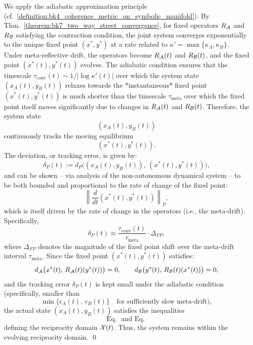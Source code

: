 \begin{demonstratio}
\label{demonstratio:bk7_meta_drift_reflective_tracking}
We apply the adiabatic approximation principle (cf.~\ref{definition:bk4_coherence_metric_on_symbolic_manifold}). By Thm.~\ref{theorem:bk7_two_way_street_convergence}, for fixed operators \(R_{\mathcal{A}}\) and \(R_{\mathcal{B}}\) satisfying the contraction condition, the joint system converges exponentially to the unique fixed point \((x^*, y^*)\) at a rate related to \(\kappa' = \max\{\kappa_A, \kappa_B\}\). Under meta-reflective drift, the operators become \(R_{\mathcal{A}}(t)\) and \(R_{\mathcal{B}}(t)\), and the fixed point \((x^*(t), y^*(t))\) evolves.
The adiabatic condition ensures that the timescale \(\tau_{\mathrm{conv}}(t) \sim 1/|\log \kappa'(t)|\) over which the system state \((x_A(t), y_B(t))\) relaxes towards the *instantaneous* fixed point \((x^*(t), y^*(t))\) is much shorter than the timescale \(\tau_{\mathrm{meta}}\) over which the fixed point itself moves significantly due to changes in \(R_{\mathcal{A}}(t)\) and \(R_{\mathcal{B}}(t)\).
Therefore, the system state
\[
(x_A(t), y_B(t))
\]
continuously tracks the moving equilibrium
\[
(x^*(t), y^*(t)).
\]
The deviation, or tracking error, is given by:
\[
\delta_P(t) := d_P\big( (x_A(t), y_B(t)),\ (x^*(t), y^*(t)) \big),
\]
and can be shown -- via analysis of the non-autonomous dynamical system -- 
to be both bounded and proportional to the rate of change of the fixed point:
\[
\left\| \frac{d}{dt}(x^*(t), y^*(t)) \right\|_P,
\]
which is itself driven by the rate of change in the operators (i.e., the meta-drift).
Specifically,
\[
\delta_P(t) \approx \frac{\tau_{\mathrm{conv}}(t)}{\tau_{\mathrm{meta}}} \cdot \Delta_{FP},
\]
where \( \Delta_{FP} \) denotes the magnitude of the fixed point shift over the meta-drift interval \( \tau_{\mathrm{meta}} \).
Since the fixed point \( (x^*(t), y^*(t)) \) satisfies:
\[
d_{\mathcal{A}}\big(x^*(t),\, R_{\mathcal{A}}(t)(y^*(t))\big) = 0,
\qquad
d_{\mathcal{B}}\big(y^*(t),\, R_{\mathcal{B}}(t)(x^*(t))\big) = 0,
\]
and the tracking error \( \delta_P(t) \) is kept small under the adiabatic condition
(specifically, smaller than
\[
\min\{ \epsilon_A(t),\ \epsilon_B(t) \}
\quad \text{for sufficiently slow meta-drift}),
\]
the actual state \( (x_A(t), y_B(t)) \) satisfies the inequalities
\[
\text{Eq.~ and Eq.~}
\]
defining the reciprocity domain \( \mathcal{X}(t) \).
Thus, the system remains within the evolving reciprocity domain. \qed
\end{demonstratio}
